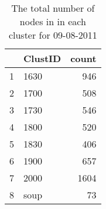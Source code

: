 \begin{table}[ht]
\centering
\begin{tabular}{rlr}
  \hline
 & ClustID & count \\ 
  \hline
1 & 1630 & 946 \\ 
  2 & 1700 & 508 \\ 
  3 & 1730 & 546 \\ 
  4 & 1800 & 520 \\ 
  5 & 1830 & 406 \\ 
  6 & 1900 & 657 \\ 
  7 & 2000 & 1604 \\ 
  8 & soup &  73 \\ 
   \hline
\end{tabular}
\caption[Nodes per cluster]{The total number of nodes in in each cluster for 09-08-2011} 
\label{table:NodesPerCluster}
\end{table}
